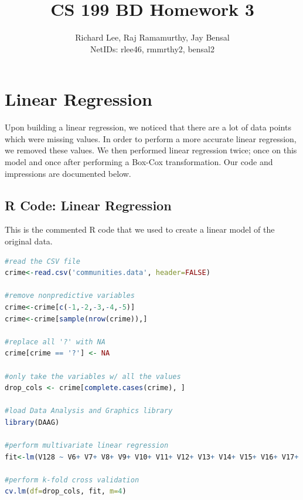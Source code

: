 \documentclass{article}
\begin{document}
\title{CS 199 BD Homework 3}
\author{Richard Lee, Raj Ramamurthy, Jay Bensal\\
  NetIDs: rlee46, rmmrthy2, bensal2}

\maketitle

\section{Linear Regression}
Upon building a linear regression, we noticed that there are a lot of data
points which were missing values. In order to perform a more accurate linear
regression, we removed these values. We then performed linear regression twice;
once on this model and once after performing a  Box-Cox transformation. Our code
and impressions are documented below.

\subsection{R Code: Linear Regression}
This is the commented R code that we used to create a linear model of the
original data.

\begin{lstlisting}[language=r]
#read the CSV file
crime<-read.csv('communities.data', header=FALSE)

#remove nonpredictive variables
crime<-crime[c(-1,-2,-3,-4,-5)]
crime<-crime[sample(nrow(crime)),]

#replace all '?' with NA
crime[crime == '?'] <- NA

#only take the variables w/ all the values
drop_cols <- crime[complete.cases(crime), ]

#load Data Analysis and Graphics library
library(DAAG)

#perform multivariate linear regression
fit<-lm(V128 ~ V6+ V7+ V8+ V9+ V10+ V11+ V12+ V13+ V14+ V15+ V16+ V17+ V18+ V19+ V20+ V21+ V22+ V23+ V24+ V25+ V26+ V27+ V28+ V29+ V30+ V32+ V33+ V34+ V35+ V36+ V37+ V38+ V39+ V40+ V41+ V42+ V43+ V44+ V45+ V46+ V47+ V48+ V49+ V50+ V51+ V52+ V53+ V54+ V55+ V56+ V57+ V58+ V59+ V60+ V61+ V62+ V63+ V64+ V65+ V66+ V67+ V68+ V69+ V70+ V71+ V72+ V73+ V74+ V75+ V76+ V77+ V78+ V79+ V80+ V81+ V82+ V83+ V84+ V85+ V86+ V87+ V88+ V89+ V90+ V91+ V92+ V93+ V94+ V95+ V96+ V97+ V98+ V99+ V100+ V101+ V119+ V120+ V121+ V126, data=drop_cols)

#perform k-fold cross validation
cv.lm(df=drop_cols, fit, m=4)
\end{lstlisting}
\end{document}
